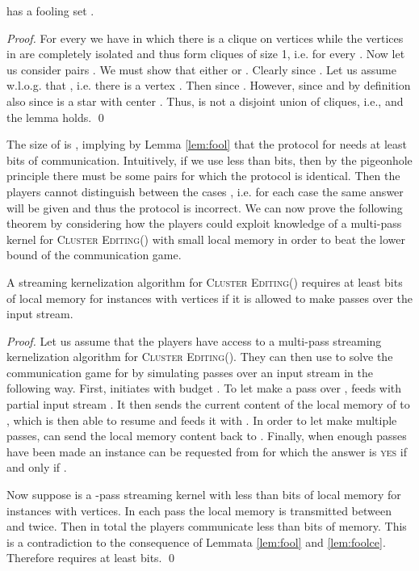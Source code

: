 \documentclass[draft,a4paper]{llncs}
\newcommand{\yes}{\textsc{yes}\xspace}
\newcommand{\CEk}{\textsc{Cluster Editing()}\xspace}
\begin{document}
\begin{lemma} \label{lem:foolce}
 has a fooling set .
\end{lemma}

\begin{proof}
For every  we have  in which there is a clique on vertices  while the vertices in  are completely isolated and thus form cliques of size 1, i.e.  for every . Now let us consider pairs . We must show that either  or .
Clearly  since . Let us assume w.l.o.g. that , i.e. there is a vertex . Then  since . However,  since  and by definition also  since  is a star with center . Thus,  is not a disjoint union of cliques, i.e.,  and the lemma holds. \qed
\end{proof}

The size of  is , implying by Lemma \ref{lem:fool} that the protocol for  needs at least  bits of communication. Intuitively, if we use less than  bits, then by the pigeonhole principle there must be some pairs  for which the protocol is identical. Then the players cannot distinguish between the cases , i.e. for each case the same answer will be given and thus the protocol is incorrect. We can now prove the following theorem by considering how the players could exploit knowledge of a multi-pass kernel for \CEk with small local memory in order to beat the lower bound of the communication game.


\begin{theorem} \label{thm:ce}
 A streaming kernelization algorithm for \CEk requires at least  bits of local memory for instances with  vertices if it is allowed to make  passes over the input stream.
\end{theorem}

\begin{proof}
 Let us assume that the players have access to a multi-pass streaming kernelization algorithm  for \CEk.
 They can then use  to solve the communication game for  by simulating passes over an input stream in the following way. First,  initiates  with budget . To let  make a pass over ,  feeds  with partial input stream . It then sends the current content of the local memory of  to , which is then able to resume  and feeds it with . In order to let  make multiple passes,  can send the local memory content back to . Finally, when enough passes have been made an instance can be requested from  for which the answer is \yes if and only if .
 
 Now suppose  is a -pass streaming kernel with less than  bits of local memory for instances with  vertices. In each pass the local memory is transmitted between  and  twice. Then in total the players communicate less than  bits of memory. This is a contradiction to the consequence of Lemmata \ref{lem:fool} and \ref{lem:foolce}. Therefore  requires at least  bits. \qed
\end{proof}
\end{document}
